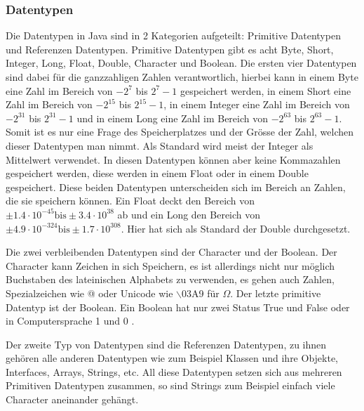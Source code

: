 \subsubsection{Datentypen}
Die Datentypen in Java sind in 2 Kategorien aufgeteilt: Primitive Datentypen und Referenzen Datentypen. Primitive Datentypen gibt es acht Byte, Short, Integer, Long, Float, Double, Character und Boolean. Die ersten vier Datentypen sind dabei für die ganzzahligen Zahlen verantwortlich, hierbei kann in einem Byte eine Zahl im Bereich von $-2^7$ bis $2^7-1$ gespeichert werden, in einem Short eine Zahl im Bereich von $-2^{15}$ bis $2^{15}-1$, in einem Integer eine Zahl im Bereich von $-2^{31}$ bis $2^{31}-1$ und in einem Long eine Zahl im Bereich von $-2^{63}$ bis $2^{63}-1$. Somit ist es nur eine Frage des Speicherplatzes und der Grösse der Zahl, welchen dieser Datentypen man nimmt. Als Standard wird meist der Integer als Mittelwert verwendet. In diesen Datentypen können aber keine Kommazahlen gespeichert werden, diese werden in einem Float oder in einem Double gespeichert. Diese beiden Datentypen unterscheiden sich im Bereich an Zahlen, die sie speichern können. Ein Float deckt den Bereich von $\pm 1.4 \cdot 10^{-45} \text{bis} \pm 3.4 \cdot 10^{38}$ ab und ein Long den Bereich von $\pm 4.9 \cdot 10^{-324} \text{bis} \pm 1.7 \cdot 10^{308}$. Hier hat sich als Standard der Double durchgesetzt.\par 
Die zwei verbleibenden Datentypen sind der Character und der Boolean. Der Character kann Zeichen in sich Speichern, es ist allerdings nicht nur möglich Buchstaben des lateinischen Alphabets zu verwenden, es gehen auch Zahlen, Spezialzeichen wie @ oder Unicode wie $\backslash$03A9 für $\Omega$. Der letzte primitive Datentyp ist der Boolean. Ein Boolean hat nur zwei Status True und False oder in Computersprache 1 und 0 \cite{studyflix_java_nodate}.\par
Der zweite Typ von Datentypen sind die Referenzen Datentypen, zu ihnen gehören alle anderen Datentypen wie zum Beispiel Klassen und ihre Objekte, Interfaces, Arrays, Strings, etc. All diese Datentypen setzen sich aus mehreren Primitiven Datentypen zusammen, so sind Strings zum Beispiel einfach viele Character aneinander gehängt.

